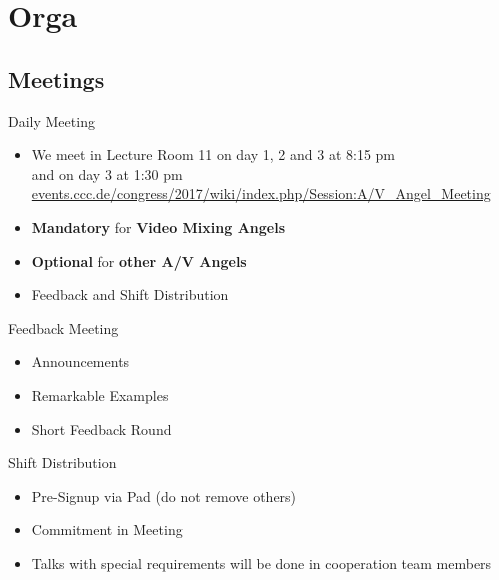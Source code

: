 \documentclass[hyperref={pdfpagelabels=false},aspectratio=169]{beamer}
\begin{document}
\section{Orga} 				%
\subsection{Meetings}
\begin{frame}{Daily Meeting}
\begin{itemize}
\item We meet in Lecture Room 11 on day 1, 2 and 3 at 8:15 pm \\and on day 3 at 1:30 pm \\
\renewcommand\UrlFont{\color{blue}\sffamily\textbf}
\url{events.ccc.de/congress/2017/wiki/index.php/Session:A/V_Angel_Meeting}
\item  \textbf{Mandatory} for \textbf{Video Mixing Angels}
\item  \textbf{Optional} for \textbf{other A/V Angels}
\item  Feedback and Shift Distribution
\end{itemize} 
\end{frame}


\begin{frame}{Feedback Meeting}		%
\begin{itemize}
	\item Announcements
	\item Remarkable Examples
	\item Short Feedback Round 
\end{itemize} 
\end{frame}

\begin{frame}{Shift Distribution}		%
\begin{itemize}
	\item Pre-Signup via Pad (do not remove others) %
	\item Commitment in Meeting %
	\item Talks with special requirements will be done in cooperation team members %
\end{itemize} 
\end{frame}
\end{document}
